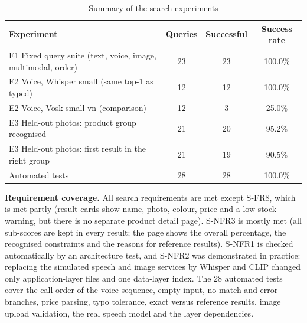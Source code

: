 \begin{table}[H]
\centering
\small
\caption{Summary of the search experiments}
\label{tab:searchsummary}
\begin{tabular}{@{}lccc@{}}
\toprule
\textbf{Experiment} & \textbf{Queries} & \textbf{Successful} & \textbf{Success rate} \\ \midrule
E1 Fixed query suite (text, voice, image, multimodal, order) & 23 & 23 & 100.0\% \\
E2 Voice, Whisper small (same top-1 as typed) & 12 & 12 & 100.0\% \\
E2 Voice, Vosk small-vn (comparison) & 12 & 3 & 25.0\% \\
E3 Held-out photos: product group recognised & 21 & 20 & 95.2\% \\
E3 Held-out photos: first result in the right group & 21 & 19 & 90.5\% \\
Automated tests & 28 & 28 & 100.0\% \\ \bottomrule
\end{tabular}
\end{table}

\textbf{Requirement coverage.} All search requirements are met except S-FR8, which is met partly (result cards show name, photo, colour, price and a low-stock warning, but there is no separate product detail page). S-NFR3 is mostly met (all sub-scores are kept in every result; the page shows the overall percentage, the recognised constraints and the reasons for reference results). S-NFR1 is checked automatically by an architecture test, and S-NFR2 was demonstrated in practice: replacing the simulated speech and image services by Whisper and CLIP changed only application-layer files and one data-layer index. The 28 automated tests cover the call order of the voice sequence, empty input, no-match and error branches, price parsing, typo tolerance, exact versus reference results, image upload validation, the real speech model and the layer dependencies.

